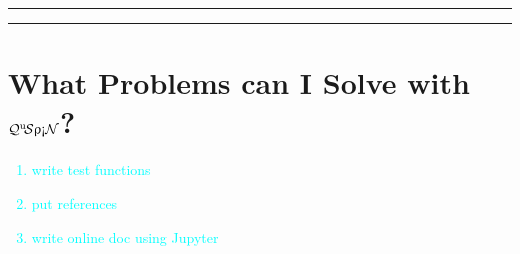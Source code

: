\documentclass{SciPost}
\newcommand\0{\scalebox{-1}[1]{0}}
\newcommand{\qspin}{$\mathcal{Q}^{\mathrm{u}}\!\mathcal{S}\uprho\mathrm{\text{\textexclamdown}}\mathcal{N}$}
\newcommand*{\cyan}{\textcolor{cyan}}
\begin{document}
\vspace{10pt}
\noindent\rule{\textwidth}{1pt}
\tableofcontents\thispagestyle{fancy}
\noindent\rule{\textwidth}{1pt}
\vspace{10pt}


\section{What Problems can I Solve with \qspin?}
\label{sec:intro}

\cyan{
	\begin{enumerate}
		\item write test functions
		\item put references
		\item write online doc using Jupyter
	\end{enumerate}
	}
\end{document}
